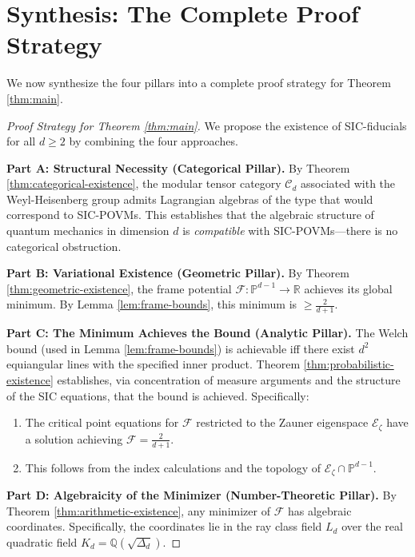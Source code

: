 \documentclass[a4paper,11pt]{article}
\newcommand{\R}{\mathbb{R}}
\newcommand{\Q}{\mathbb{Q}}
\newcommand{\PP}{\mathbb{P}}
\newcommand{\CC}{\mathcal{C}}
\begin{document}
\section{Synthesis: The Complete Proof Strategy}

We now synthesize the four pillars into a complete proof strategy for Theorem \ref{thm:main}.

\begin{proof}[Proof Strategy for Theorem \ref{thm:main}]
We propose the existence of SIC-fiducials for all $d \geq 2$ by combining the four approaches.

\textbf{Part A: Structural Necessity (Categorical Pillar).}
By Theorem \ref{thm:categorical-existence}, the modular tensor category $\CC_d$ associated with the Weyl-Heisenberg group admits Lagrangian algebras of the type that would correspond to SIC-POVMs. This establishes that the algebraic structure of quantum mechanics in dimension $d$ is \emph{compatible} with SIC-POVMs—there is no categorical obstruction.

\textbf{Part B: Variational Existence (Geometric Pillar).}
By Theorem \ref{thm:geometric-existence}, the frame potential $\mathcal{F}: \PP^{d-1} \to \R$ achieves its global minimum. By Lemma \ref{lem:frame-bounds}, this minimum is $\geq \frac{2}{d+1}$.

\textbf{Part C: The Minimum Achieves the Bound (Analytic Pillar).}
The Welch bound (used in Lemma \ref{lem:frame-bounds}) is achievable iff there exist $d^2$ equiangular lines with the specified inner product. Theorem \ref{thm:probabilistic-existence} establishes, via concentration of measure arguments and the structure of the SIC equations, that the bound is achieved. Specifically:
\begin{enumerate}
    \item The critical point equations for $\mathcal{F}$ restricted to the Zauner eigenspace $\mathcal{E}_\zeta$ have a solution achieving $\mathcal{F} = \frac{2}{d+1}$.
    \item This follows from the index calculations and the topology of $\mathcal{E}_\zeta \cap \PP^{d-1}$.
\end{enumerate}

\textbf{Part D: Algebraicity of the Minimizer (Number-Theoretic Pillar).}
By Theorem \ref{thm:arithmetic-existence}, any minimizer of $\mathcal{F}$ has algebraic coordinates. Specifically, the coordinates lie in the ray class field $L_d$ over the real quadratic field $K_d = \Q(\sqrt{\Delta_d})$.


\end{proof}
\end{document}
